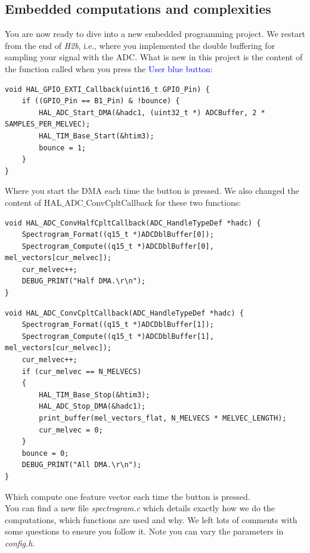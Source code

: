 \subsection{Embedded computations and complexities}
%
You are now ready to dive into a new embedded programming project.
We restart from the end of \emph{H2b}, i.e., where you implemented the double buffering for sampling your signal with the ADC. What is new in this project is the content of the function called when you press the \textcolor{blue}{User blue button}: \\
%
\begin{lstlisting}
void HAL_GPIO_EXTI_Callback(uint16_t GPIO_Pin) {
	if ((GPIO_Pin == B1_Pin) & !bounce) {
		HAL_ADC_Start_DMA(&hadc1, (uint32_t *) ADCBuffer, 2 * SAMPLES_PER_MELVEC);
		HAL_TIM_Base_Start(&htim3);
		bounce = 1;
	}
}
\end{lstlisting}
%
Where you start the DMA each time the button is pressed. We also changed the content of \newline HAL$\_$ADC$\_$ConvCpltCallback for these two functions:
%
\begin{lstlisting}
void HAL_ADC_ConvHalfCpltCallback(ADC_HandleTypeDef *hadc) {
	Spectrogram_Format((q15_t *)ADCDblBuffer[0]);
	Spectrogram_Compute((q15_t *)ADCDblBuffer[0], mel_vectors[cur_melvec]);
	cur_melvec++;
	DEBUG_PRINT("Half DMA.\r\n");
}
\end{lstlisting}
\begin{lstlisting}
void HAL_ADC_ConvCpltCallback(ADC_HandleTypeDef *hadc) {
	Spectrogram_Format((q15_t *)ADCDblBuffer[1]);
	Spectrogram_Compute((q15_t *)ADCDblBuffer[1], mel_vectors[cur_melvec]);
	cur_melvec++;
	if (cur_melvec == N_MELVECS)
	{
		HAL_TIM_Base_Stop(&htim3);
		HAL_ADC_Stop_DMA(&hadc1);
		print_buffer(mel_vectors_flat, N_MELVECS * MELVEC_LENGTH);
		cur_melvec = 0;
	}
	bounce = 0;
	DEBUG_PRINT("All DMA.\r\n");
}
\end{lstlisting}
%
Which compute one feature vector each time the button is pressed. \\
You can find a new file \emph{spectrogram.c} which details exactly how we do the computations, which functions are used and why. We left lots of comments with some questions to ensure you follow it. Note you can vary the parameters in \emph{config.h}. \\
\\

